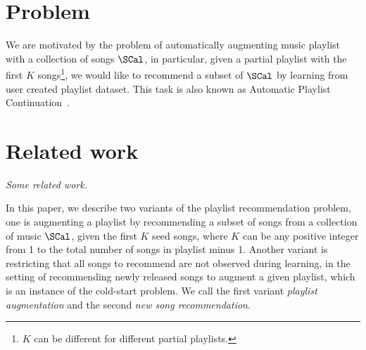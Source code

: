 %
% 
%
%
%

\section{Problem}

We are motivated by the problem of automatically augmenting music playlist with a collection of songs $\SCal$,
in particular, given a partial playlist with the first $K$ songs\footnote{$K$ can be different for different partial playlists.},
we would like to recommend a subset of $\SCal$ by learning from user created playlist dataset.
This task is also known as Automatic Playlist Continuation~\cite{schedl2017,recsysch2018}.


\section{Related work}
{\it Some related work.}

In this paper, we describe two variants of the playlist recommendation problem,
one is augmenting a playlist by recommending a subset of songs from a collection of music $\SCal$,
given the first $K$ seed songs, where $K$ can be any positive integer from 1 to the total number of songs in playlist minus 1.
Another variant is restricting that all songs to recommend are not observed during learning,
\ie in the setting of recommending newly released songs to augment a given playlist, which is an instance of the cold-start problem.
We call the first variant \emph{playlist augmentation} and the second \emph{new song recommendation}.


